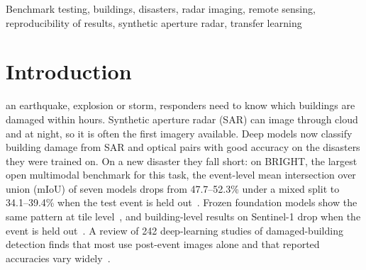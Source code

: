 \documentclass{ieeeaccess}
\begin{document}
\begin{keywords}
Benchmark testing, buildings, disasters, radar imaging, remote sensing, reproducibility of results, synthetic aperture radar, transfer learning
\end{keywords}

\titlepgskip=-21pt

\maketitle



\section{Introduction}
\label{sec:introduction}
 an earthquake, explosion or storm, responders need to know which buildings are damaged within hours. Synthetic aperture radar (SAR) can image through cloud and at night, so it is often the first imagery available. Deep models now classify building damage from SAR and optical pairs with good accuracy on the disasters they were trained on. On a new disaster they fall short: on BRIGHT, the largest open multimodal benchmark for this task, the event-level mean intersection over union (mIoU) of seven models drops from 47.7--52.3\% under a mixed split to 34.1--39.4\% when the test event is held out~\cite{chen2025bright}. Frozen foundation models show the same pattern at tile level~\cite{shibli2026shortcut}, and building-level results on Sentinel-1 drop when the event is held out~\cite{currie2026transfer}. A review of 242 deep-learning studies of damaged-building detection finds that most use post-event images alone and that reported accuracies vary widely~\cite{wang2024review}.
\end{document}
